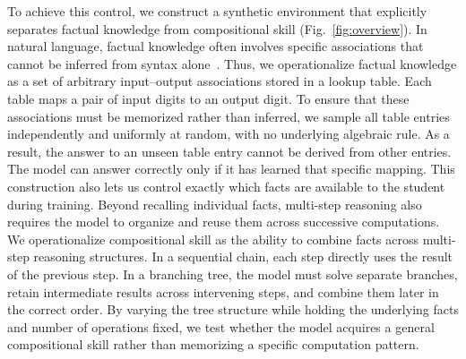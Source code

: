 \documentclass[]{template}
\theoremstyle{plain}
\theoremstyle{definition}
\theoremstyle{remark}
\begin{document}
To achieve this control, we construct a synthetic environment that explicitly separates factual knowledge from compositional skill (Fig.~\ref{fig:overview}). In natural language, factual knowledge often involves specific associations that cannot be inferred from syntax alone~\citep{morris2026how}. Thus, we operationalize factual knowledge as a set of arbitrary input–output associations stored in a lookup table. Each table maps a pair of input digits to an output digit. To ensure that these associations must be memorized rather than inferred, we sample all table entries independently and uniformly at random, with no underlying algebraic rule. As a result, the answer to an unseen table entry cannot be derived from other entries. The model can answer correctly only if it has learned that specific mapping. This construction also lets us control exactly which facts are available to the student during training.
Beyond recalling individual facts, multi-step reasoning also requires the model to organize and reuse them across successive computations. 
We operationalize compositional skill as the ability to combine facts across multi-step reasoning structures. In a sequential chain, each step directly uses the result of the previous step. In a branching tree, the model must solve separate branches, retain intermediate results across intervening steps, and combine them later in the correct order. By varying the tree structure while holding the underlying facts and number of operations fixed, we test whether the model acquires a general compositional skill rather than memorizing a specific computation pattern.%
\end{document}
